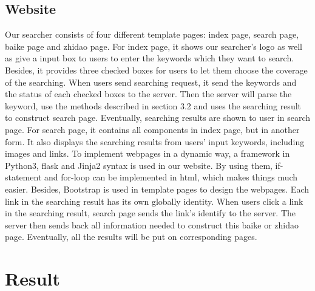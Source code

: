 \documentclass[10pt,times,twocolumn]{article}
\begin{document}
\subsection{Website}
Our searcher consists of four different template pages: index page, search page, baike page and zhidao page. 
\newline
For index page, it shows our searcher’s logo as well as give a input box to users to enter the keywords which they want to search. Besides, it provides three checked boxes for users to let them choose the coverage of the searching.  When users send searching request, it send the keywords and the status of each checked boxes to the server. Then the server will parse the keyword, use the methods described in section 3.2 and uses the searching result to construct search page. Eventually, searching results are shown to user in search page.
\newline
For search page, it contains all components in index page, but in another form. It also displays the searching results from users’ input keywords, including images and links. To implement webpages in a  dynamic way,  a framework in Python3, flask and Jinja2 syntax is used in our website. By using them, if-statement and for-loop can be implemented in html, which makes things much easier. Besides, Bootstrap is used in template pages to design the webpages. 
\newline
Each link in the searching result has its own globally identity. When users click a link in the searching result, search page sends the link’s identify to the server. The server then sends back all information needed to construct this baike or zhidao page. Eventually, all the results will be put on corresponding pages.


\section{Result}
\end{document}
